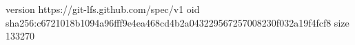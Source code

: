 version https://git-lfs.github.com/spec/v1
oid sha256:c6721018b1094a96fff9e4ea468cd4b2a043229567257008230f032a19f4fcf8
size 133270
